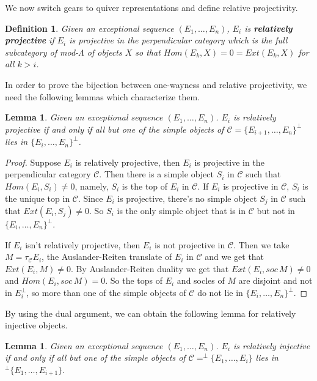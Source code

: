 \documentclass[11pt]{amsart}
\newtheorem{defi}[thm]{Definition}%
\newtheorem{lemma}[thm]{Lemma}%
\begin{document}
We now switch gears to quiver representations and define relative projectivity. 

\begin{defi}
    Given an exceptional sequence $(E_1,\dots,E_n)$, $E_i$ is \textbf{relatively projective} if $E_i$ is projective in the perpendicular category which is the full subcategory of mod-$\Lambda$ of objects $X$ so that $Hom(E_k,X)=0=Ext(E_k,X)$ for all $k > i$.
\end{defi}

In order to prove the bijection between one-wayness and relative projectivity, we need the following lemmas which characterize them.

\begin{lemma}
    Given an exceptional sequence $(E_1,\dots,E_n)$. $E_i$ is relatively projective if and only if all but one of the simple objects of $\mathcal C=\{E_{i+1},\dots,E_n\}^\perp$ lies in $\{E_i,\dots,E_n\}^\perp$. %
\end{lemma}

\begin{proof}
    Suppose $E_i$ is relatively projective, then $E_i$ is projective in the perpendicular category $\mathcal C$.
    Then there is a simple object $S_i$ in $\mathcal C$ such that $Hom(E_i,S_i) \neq 0$, namely, $S_i$ is the top of $E_i$ in $\mathcal C$. If $E_i$ is projective in $\mathcal C$, $S_i$ is the unique top in $\mathcal C$. Since $E_i$ is projective, there's no simple object $S_j$ in $\mathcal C$ such that $Ext(E_i,S_j) \neq 0$.
    So $S_i$ is the only simple object that is in $\mathcal C$ but not in $\{E_i,\dots,E_n\}^\perp$.

    If $E_i$ isn't relatively projective, then $E_i$ is not projective in $\mathcal C$. Then we take $M=\tau_{\mathcal C}E_i$, the Auslander-Reiten translate of $E_i$ in $\mathcal C$ and we get that $Ext(E_i,M) \neq 0$. By Auslander-Reiten duality we get that $Ext(E_i,soc\,M)\neq0$ and $Hom(E_i,soc\,M)=0$. So the tops of $E_i$ and socles of $M$ are disjoint and not in $E_i^\perp$, so more than one of the simple objects of $\mathcal C$ do not lie in $\{E_i,\dots,E_n\}^\perp$.
\end{proof}

By using the dual argument, we can obtain the following lemma for relatively injective objects.

\begin{lemma}
    Given an exceptional sequence $(E_1,\dots,E_n)$. $E_i$ is relatively injective if and only if all but one of the simple objects of $\mathcal C=^\perp\{E_1,\dots,E_i\}$ lies in $^\perp\{E_1,\dots,E_{i+1}\}$. %
\end{lemma}
\end{document}
